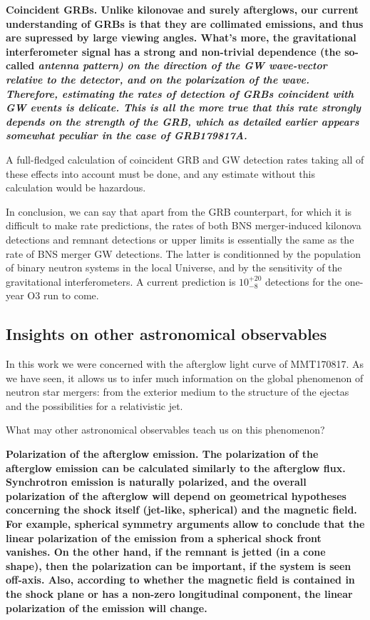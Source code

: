 \bf{Coincident GRBs. }Unlike kilonovae and surely afterglows, our current understanding of GRBs is that they are collimated emissions, and thus are supressed by large viewing angles. What's more, the gravitational interferometer signal has a strong and non-trivial dependence (the so-called \it{antenna pattern}) on the direction of the GW wave-vector relative to the detector, and on the polarization of the wave. Therefore, estimating the rates of detection of GRBs coincident with GW events is delicate. This is all the more true that this rate strongly depends on the strength of the GRB, which as detailed earlier appears somewhat peculiar in the case of GRB179817A.

A full-fledged calculation of coincident GRB and GW detection rates taking all of these effects into account must be done, and any estimate without this calculation would be hazardous.

In conclusion, we can say that apart from the GRB counterpart, for which it is difficult to make rate predictions, the rates of both BNS merger-induced kilonova detections and remnant detections or upper limits is essentially the same as the rate of BNS merger GW detections. The latter is conditionned by the population of binary neutron systems in the local Universe, and by the sensitivity of the gravitational interferometers. A current prediction is $10^{+20}_{-8}$ detections for the one-year O3 run to come.

\subsection{Insights on other astronomical observables}

In this work we were concerned with the afterglow light curve of MMT170817. As we have seen, it allows us to infer much information on the global phenomenon of neutron star mergers: from the exterior medium to the structure of the ejectas and the possibilities for a relativistic jet.

What may other astronomical observables teach us on this phenomenon?



\bf{Polarization of the afterglow emission.} The polarization of the afterglow emission can be calculated similarly to the afterglow flux. Synchrotron emission is naturally polarized, and the overall polarization of the afterglow will depend on geometrical hypotheses concerning the shock itself (jet-like, spherical) and the magnetic field. For example, spherical symmetry arguments allow to conclude that the linear polarization of the emission from  a spherical shock front vanishes. On the other hand, if the remnant is jetted (in a cone shape), then the polarization can be important, if the system is seen off-axis. Also, according to whether the magnetic field is contained in the shock plane or has a non-zero longitudinal component, the linear polarization of the emission will change.

